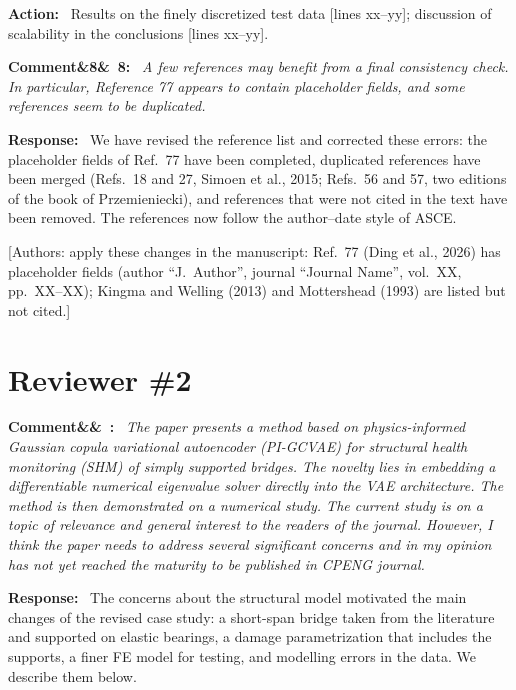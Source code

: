 \documentclass[11pt]{article}
\newenvironment{rcomment}[1]{\par\bigskip\noindent\textbf{Comment\ifx&#1&\else\ #1\fi:}\ \itshape}{\par}
\newenvironment{response}{\par\smallskip\noindent\color{resp}\textbf{Response:}\ }{\par}
\newenvironment{action}{\par\smallskip\noindent\color{resp}\textbf{Action:}\ }{\par}
\newcommand{\authornote}[1]{\textcolor{note}{\textsf{[Authors: #1]}}}
\newcommand{\tbd}[1]{\textcolor{note}{\textsf{[#1]}}}
\newcommand{\lines}[1]{\tbd{lines #1}}
\begin{document}
\begin{action}
Results on the finely discretized test data \lines{xx--yy}; discussion of scalability in the conclusions
\lines{xx--yy}.
\end{action}

\begin{rcomment}{8}
A few references may benefit from a final consistency check. In particular, Reference 77 appears to contain placeholder fields, and some references seem to be duplicated.
\end{rcomment}

\begin{response}
We have revised the reference list and corrected these errors: the placeholder fields of Ref.~77 have been completed,
duplicated references have been merged (Refs.~18 and 27, Simoen et al., 2015; Refs.~56 and 57, two editions of the book
of Przemieniecki), and references that were not cited in the text have been removed. The references now follow the
author--date style of ASCE.
\end{response}
\authornote{apply these changes in the manuscript: Ref.~77 (Ding et al., 2026) has placeholder fields (author ``J.~Author'',
journal ``Journal Name'', vol.~XX, pp.~XX--XX); Kingma and Welling (2013) and Mottershead (1993) are listed but not
cited.}

\section{Reviewer \#2}

\begin{rcomment}{}
The paper presents a method based on physics-informed Gaussian copula variational autoencoder (PI-GCVAE) for
structural health monitoring (SHM) of simply supported bridges. The novelty lies in embedding a differentiable numerical
eigenvalue solver directly into the VAE architecture. The method is then demonstrated on a numerical study. The current
study is on a topic of relevance and general interest to the readers of the journal. However, I think the paper needs to
address several significant concerns and in my opinion has not yet reached the maturity to be published in CPENG
journal.
\end{rcomment}

\begin{response}
The concerns about the structural model motivated the main changes of the revised case study: a short-span bridge taken
from the literature and supported on elastic bearings, a damage parametrization that includes the supports, a finer FE
model for testing, and modelling errors in the data. We describe them below.
\end{response}
\end{document}
